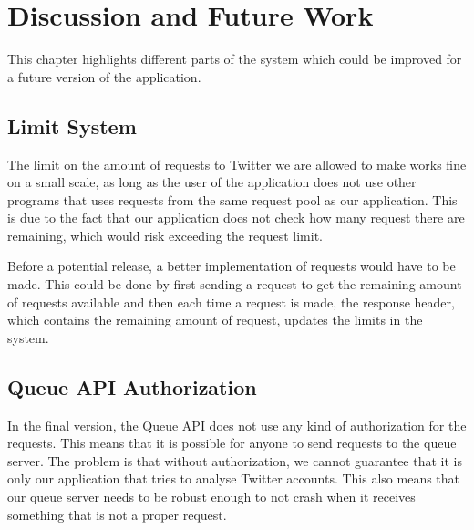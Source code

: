 \chapter{Discussion and Future Work}\label{fwork}
This chapter highlights different parts of the system which could
be improved for a future version of the application.

\section*{Limit System}
The limit on the amount of requests to Twitter we are allowed to make works fine
on a small scale, as long as the user of the application does not use other
programs that uses requests from the same request pool as our application. This
is due to the fact that our application does not check how many request there
are remaining, which would risk exceeding the request limit. \nl

Before a potential release, a better implementation of requests would have to be
made. This could be done by first sending a request to get the remaining amount
of requests available and then each time a request is made, the response
header, which contains the remaining amount of request, updates the
limits in the system.\nl



\section*{Queue API Authorization}
In the final version, the Queue API does not use any kind of authorization for
the requests. This means that it is possible for anyone to send requests to the
queue server. The problem is that without authorization, we cannot guarantee
that it is only our application that tries to analyse Twitter accounts. This
also means that our queue server needs to be robust enough to not crash when it
receives something that is not a proper request. \nl

